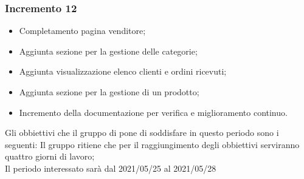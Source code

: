 \subsubsection{Incremento 12}
\begin{itemize}
    \item Completamento pagina venditore;
    \item Aggiunta sezione per la gestione delle categorie;
    \item Aggiunta visualizzazione elenco clienti e ordini ricevuti;
    \item Aggiunta sezione per la gestione di un prodotto;
    \item Incremento della documentazione per verifica e miglioramento continuo.
\end{itemize}
Gli obbiettivi che il gruppo di pone di soddisfare in questo periodo sono i seguenti:
Il gruppo ritiene che per il raggiungimento degli obbiettivi serviranno quattro giorni di lavoro;\\
Il periodo interessato sarà dal 2021/05/25 al 2021/05/28

